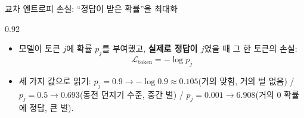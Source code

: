 \begin{frame}{교차 엔트로피 손실: ``정답이 받은 확률''을 최대화}
\begin{center}\begin{varwidth}{0.92\textwidth}
  \begin{itemize}
    \item 모델이 토큰 $j$에 확률 $p_j$를 부여했고,
      \textbf{실제로 정답이 $j$}였을 때 그 한 토큰의 손실:
      \[\mathcal{L}_{\text{token}} = -\log p_j\]
    \item 세 가지 값으로 읽기: $p_j = 0.9 \to -\log 0.9
      \approx 0.105$(거의 맞힘, 거의 벌 없음) / $p_j = 0.5 \to
      0.693$(동전 던지기 수준, 중간 벌) / $p_j = 0.001 \to
      6.908$(거의 0 확률에 정답, 큰 벌).
    
    
  \end{itemize}
\end{varwidth}\end{center}
\end{frame}
